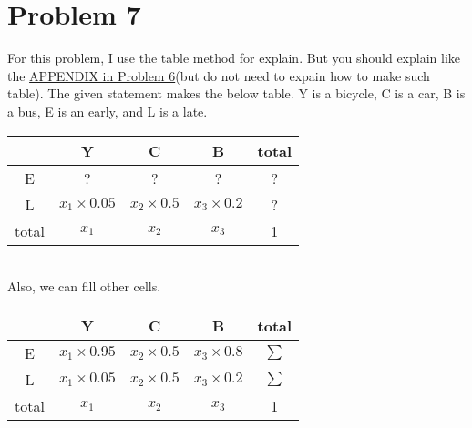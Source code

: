 \section*{Problem 7}
	For this problem, I use the table method for explain. But you should explain like the \hyperref[APPENDIX]{APPENDIX in Problem 6}(but do not need to expain how to make such table). The given statement makes the below table. Y is a bicycle, C is a car, B is a bus, E is an early, and L is a late.
	\begin{table}[htb!]
		\setlength{\tabcolsep}{10pt}
		\renewcommand{\arraystretch}{2}
		\centering
		\begin{tabular}{c|ccc|c}
			& Y               & C              & B              & total \\ \hline
			E     & ?               & ?              & ?              & ?     \\
			L     & $x_1\times0.05$ & $x_2\times0.5$ & $x_3\times0.2$ & ?     \\ \hline
			total & $x_1$           & $x_2$          & $x_3$          & 1    
		\end{tabular}
	\end{table}\\
	Also, we can fill other cells.
	\begin{table}[htb!]
		\setlength{\tabcolsep}{10pt}
		\renewcommand{\arraystretch}{2}
		\centering
		\begin{tabular}{c|ccc|c}
			& Y               & C              & B              & total \\ \hline
			E     & $x_1\times0.95$ & $x_2\times0.5$ & $x_3\times0.8$ & $\sum$     \\
			L     & $x_1\times0.05$ & $x_2\times0.5$ & $x_3\times0.2$ & $\sum$     \\ \hline
			total & $x_1$           & $x_2$          & $x_3$          & 1    
		\end{tabular}
	\end{table}\\
